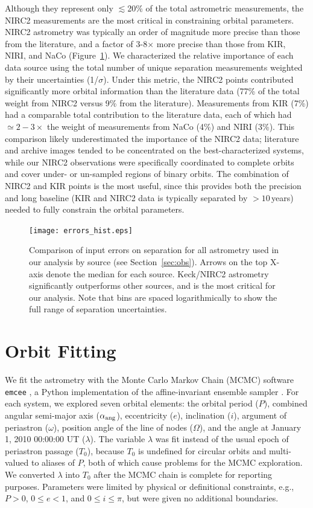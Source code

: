 \documentclass[twocolumn]{aastex62}
\begin{document}
Although they represent only $\lesssim$20\% of the total astrometric measurements, the NIRC2 measurements are the most critical in constraining orbital parameters. NIRC2 astrometry was typically an order of magnitude more precise than those from the literature, and a factor of 3-8$\times$ more precise than those from KIR, NIRI, and NaCo (Figure~\ref{fig:errors}). We characterized the relative importance of each data source using the total number of unique separation measurements weighted by their uncertainties (1/$\sigma$). Under this metric, the NIRC2 points contributed significantly more orbital information than the literature data (77\% of the total weight from NIRC2 versus 9\% from the literature). Measurements from KIR (7\%) had a comparable total contribution to the literature data, each of which had $\simeq2-3\times$ the weight of measurements from NaCo (4\%) and NIRI (3\%). This comparison likely underestimated the importance of the NIRC2 data; literature and archive images tended to be concentrated on the best-characterized systems, while our NIRC2 observations were specifically coordinated to complete orbits and cover under- or un-sampled regions of binary orbits. The combination of NIRC2 and KIR points is the most useful, since this provides both the precision and long baseline (KIR and NIRC2 data is typically separated by $>10$\,years) needed to fully constrain the orbital parameters.

\begin{figure}[htb]
\begin{center}
\texttt{[image: errors\_hist.eps]}
\caption{Comparison of input errors on separation for all astrometry used in our analysis by source (see Section~\ref{sec:obs}). Arrows on the top X-axis denote the median for each source. Keck/NIRC2 astrometry significantly outperforms other sources, and is the most critical for our analysis. Note that bins are spaced logarithmically to show the full range of separation uncertainties. }
\label{fig:errors}
\end{center}
\end{figure}


\section{Orbit Fitting}\label{sec:orbit}
We fit the astrometry with the Monte Carlo Markov Chain (MCMC) software {\tt emcee} \citep{Foreman-Mackey2013}, a Python implementation of the affine-invariant ensemble sampler \citep{goodman2010}. For each system, we explored seven orbital elements: the orbital period ($P$), combined angular semi-major axis ($\alpha_{\rm{ang}}$), eccentricity ($e$), inclination ($i$), argument of periastron ($\omega$), position angle of the line of nodes ($\Omega$), and 
the angle at January 1, 2010 00:00:00 UT ($\lambda$). The variable $\lambda$ was fit instead of the usual epoch of periastron passage ($T_0$), because $T_0$ is undefined for circular orbits and multi-valued to aliases of $P$, both of which cause problems for the MCMC exploration. We converted $\lambda$ into $T_0$ after the MCMC chain is complete for reporting purposes. Parameters were limited by physical or definitional constraints, e.g., $P>0$, $0 \le e<1$, and $0\le i \le \pi$, but were given no additional boundaries. 
\end{document}
